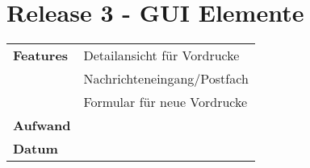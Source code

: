 
\section*{Release 3 - GUI Elemente}
\label{sec:release_3}

\begin{tabular}{p{5cm} p{9cm}}
    \textbf{Features} & Detailansicht für Vordrucke \\
    & Nachrichteneingang/Postfach \\
    & Formular für neue Vordrucke \\
    \hline
    \textbf{Aufwand} & \\
    \hline
    \textbf{Datum} & \\
\end{tabular}

